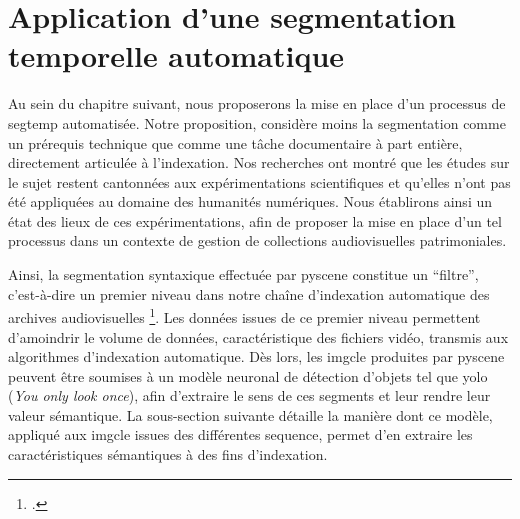 \chapter{\label{II_1}Application d'une segmentation temporelle automatique}

Au sein du chapitre suivant, nous proposerons la mise en place d’un processus de \gls{segtemp} automatisée. Notre proposition, considère moins la segmentation comme un prérequis technique que comme une tâche documentaire à part entière, directement articulée à l’indexation. Nos recherches ont montré que les études sur le sujet restent cantonnées aux expérimentations scientifiques et qu'elles n'ont pas été appliquées au domaine des humanités numériques. Nous établirons ainsi un état des lieux de ces expérimentations, afin de proposer la mise en place d'un tel processus dans un contexte de gestion de collections audiovisuelles patrimoniales.    









Ainsi, la segmentation syntaxique effectuée par \gls{pyscene} constitue un “filtre”, c’est-à-dire un premier niveau dans notre chaîne d’indexation automatique des archives audiovisuelles \footcite{xin2023}. Les données issues de ce premier niveau permettent d’amoindrir le volume de données, caractéristique des fichiers vidéo, transmis aux algorithmes d’indexation automatique. Dès lors, les \gls{imgcle} produites par \gls{pyscene} peuvent être soumises à un modèle neuronal de détection d’objets tel que \gls{yolo} (\textit{You only look once}), afin d’extraire le sens de ces segments et leur rendre leur valeur sémantique. La sous-section suivante détaille la manière dont ce modèle, appliqué aux \gls{imgcle} issues des différentes \gls{sequence}, permet d’en extraire les caractéristiques sémantiques à des fins d’indexation.  





